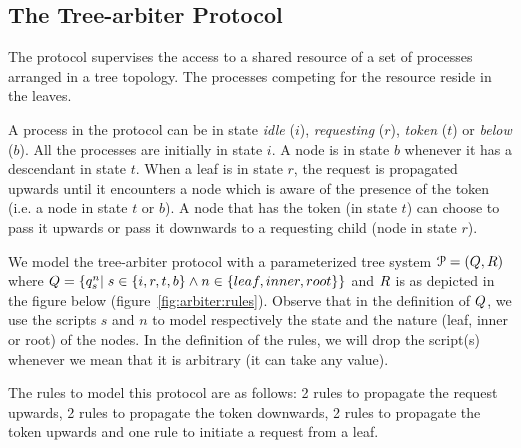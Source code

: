 \subsection{The Tree-arbiter Protocol}

The protocol supervises the access to a shared resource of a set of processes arranged in 
a tree topology.
%
The processes competing for the resource reside in the leaves.
%

A process in the protocol can be in state \emph{idle} ($i$), \emph{requesting} ($r$),  
\emph{token} ($t$) or \emph{below} ($b$).
%
All the processes are initially in state $i$.
%
A node is in state $b$ whenever it has a descendant in state $t$.
%
When a leaf is in state $r$, the request is propagated upwards
until it encounters a node which is aware of the presence of the token (i.e. a
node in state $t$ or $b$).
%
A node that has the token (in state $t$) can choose to pass it upwards or pass it downwards 
to a requesting child (node in state $r$).
%

We model the tree-arbiter protocol with a parameterized tree system ${\EuScript P}=\left(Q,R\right)$ 
where $Q=\left\{q_s^n|\;s\in\left\{i,r,t,b\right\}\wedge n\in\left\{leaf,inner,root\right\}\right\}$ and 
$R$ is as depicted in the figure below (figure~\ref{fig:arbiter:rules}).
%
Observe that in the definition of $Q$, we use the scripts $s$ and $n$ to model respectively 
the state and the nature (leaf, inner or root) of the nodes.
%
In the definition of the rules, we will drop the script(s) whenever we mean that it is arbitrary 
(it can take any value).
%

The rules to model this protocol are as follows: 
%
2 rules to propagate the
request upwards, 
%
2 rules to propagate the token downwards, 
%
2 rules to propagate the token upwards and one rule to initiate a request from a leaf. 
%

